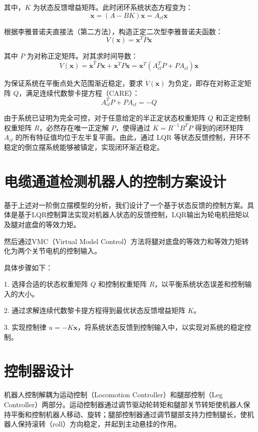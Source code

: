 其中，$K$ 为状态反馈增益矩阵。此时闭环系统状态方程变为：
\begin{equation}
\dot{\mathbf{x}} = (A - BK)\mathbf{x} = A_{cl}\mathbf{x}
\end{equation}

根据李雅普诺夫直接法（第二方法），构造正定二次型李雅普诺夫函数：
\begin{equation}
V(\mathbf{x}) = \mathbf{x}^T P \mathbf{x}
\end{equation}

其中 $P$ 为对称正定矩阵。对其求时间导数：
\begin{equation}
\dot{V}(\mathbf{x}) = \dot{\mathbf{x}}^T P \mathbf{x} + \mathbf{x}^T P \dot{\mathbf{x}} = \mathbf{x}^T (A_{cl}^T P + P A_{cl}) \mathbf{x}
\end{equation}

为保证系统在平衡点处大范围渐近稳定，要求 $\dot{V}(\mathbf{x})$ 为负定，即存在对称正定矩阵 $Q$，满足连续代数黎卡提方程（CARE）：
\begin{equation}
A_{cl}^T P + P A_{cl} = -Q
\end{equation}

由于系统已证明为完全可控，对于任意给定的半正定状态权重矩阵 $Q$ 和正定控制权重矩阵 $R$，必然存在唯一正定解 $P$，使得通过 $K = R^{-1}B^T P$ 得到的闭环矩阵 $A_{cl}$ 的所有特征值均位于左半复平面。由此，通过 LQR 等状态反馈控制，开环不稳定的倒立摆系统能够被镇定，实现闭环渐近稳定。

\section{电缆通道检测机器人的控制方案设计}
基于上述对一阶倒立摆模型的分析，我们设计了一个基于状态反馈的控制方案。具体是基于LQR控制算法实现对机器人状态的反馈控制，LQR输出为轮电机扭矩以及腿对底盘的等效力矩。

然后通过VMC（Virtual Model Control）方法将腿对底盘的等效力和等效力矩转化为两个关节电机的控制输入。

具体步骤如下：

1. 选择合适的状态权重矩阵 $Q$ 和控制权重矩阵 $R$，以平衡系统状态误差和控制输入的大小。

2. 通过求解连续代数黎卡提方程得到最优状态反馈增益矩阵 $K$。

3. 实现控制律 $u = -K\mathbf{x}$，将系统状态反馈到控制输入中，以实现对系统的稳定控制。

\section{控制器设计}
机器人控制解耦为运动控制（Locomotion Controller）和腿部控制（Leg Controller）两部分。运动控制器通过调节驱动轮转矩和腿部关节转矩使机器人保持平衡和控制机器人移动、旋转；腿部控制器通过调节腿部支持力控制腿长，使机器人保持滚转（roll）方向稳定，并起到主动悬挂的作用。

